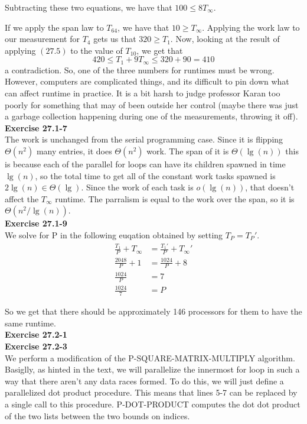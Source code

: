\documentclass{article}
\begin{document}
Subtracting these two equations, we have that $100 \le 8 T_\infty$.

If we apply the span law to $T_64$, we have that $10\ge T_\infty$. Applying the work law to our measurement for $T_4$ gets us that $320 \ge  T_1$. Now, looking at the result of applying $(27.5)$ to the value of $T_10$, we get that
\[
420 \le T_1 + 9T_\infty \le 320 + 90 = 410
\]
a contradiction. So, one of the three numbers for runtimes must be wrong. However, computers are complicated things, and its difficult to pin down what can affect runtime in practice. It is a bit harsh to judge professor Karan too poorly for something that may of been outside her control (maybe there was just a garbage collection happening during one of the measurements, throwing it off).\\

\noindent\textbf{Exercise 27.1-7}\\
The work is unchanged from the serial programming case. Since it is flipping $\Theta(n^2)$ many entries, it does $\Theta(n^2)$ work. The span of it is $\Theta(\lg(n))$ this is because each of the parallel for loops can have its children spawned in time $\lg(n)$, so the total time to get all of the constant work tasks spawned is $2\lg(n) \in \Theta(\lg)$. Since the work of each task is $o(\lg(n))$, that doesn't affect the $T_\infty$ runtime. The parralism is equal to the work over the span, so it is $\Theta(n^2/\lg(n))$.\\

\noindent\textbf{Exercise 27.1-9}\\
We solve for P in the following euqation obtained by setting $T_P = T_P'$.
\begin{align*}
\frac{T_1}{P}+T_\infty &= \frac{T_1'}{P} + T_\infty'\\
\frac{2048}{P} + 1 &= \frac{1024}{P}+8\\
\frac{1024}{P} &= 7\\
\frac{1024}{7} &=P
\end{align*}

So we get that there should be approximately 146 processors for them to have the same runtime.\\

\noindent\textbf{Exercise 27.2-1}\\

\noindent\textbf{Exercise 27.2-3}\\
We perform a modification of the P-SQUARE-MATRIX-MULTIPLY algorithm. Basiglly, as hinted in the text, we will parallelize the innermost for loop in such a way that there aren't any data races formed. To do this, we will just define a parallelized dot product procedure. This means that lines 5-7 can be replaced by a single call to this procedure. P-DOT-PRODUCT computes the dot dot product of the two lists between the two bounds on indices.
\end{document}

